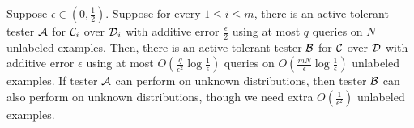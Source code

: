 \begin{theorem}
Suppose $\epsilon\in(0,\frac{1}{2})$. Suppose for every $1\leq i\leq m$, there is an active tolerant tester ${\mathcal{A}}$ for ${\mathcal{C}}_i$ over ${\mathcal{D}}_i$ with additive error $\frac\epsilon 2$ using at most $q$ queries on $N$ unlabeled examples. Then, there is an active tolerant tester ${\mathcal B}$ for ${\mathcal{C}}$ over ${\mathcal{D}}$ with additive error $\epsilon$ using at most $O(\frac{q}{\epsilon^2}\log\frac{1}{\epsilon})$ queries on $O(\frac{mN}{\epsilon}\log\frac{1}{\epsilon})$ unlabeled examples. If tester ${\mathcal{A}}$ can perform on unknown distributions, then tester ${\mathcal B}$ can also perform on unknown distributions, though we need extra $O(\frac{1}{\epsilon^2})$ unlabeled examples.


\end{theorem}



